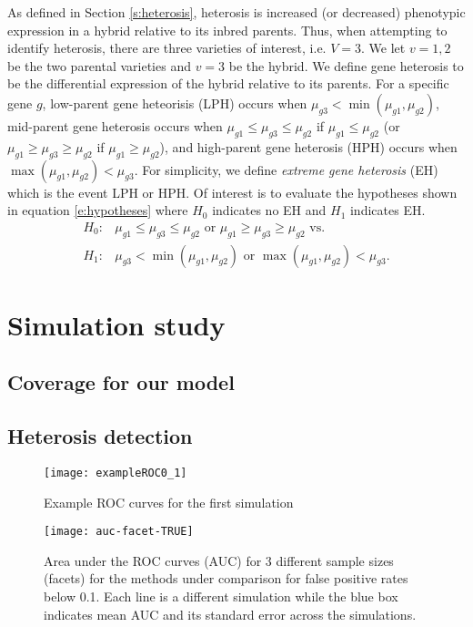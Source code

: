 \documentclass[useAMS,usenatbib,referee]{biom}
\begin{document}
As defined in Section \ref{s:heterosis}, heterosis is increased (or decreased) phenotypic expression in a hybrid relative to its inbred parents. Thus, when attempting to identify heterosis, there are three varieties of interest, i.e. $V=3$. We let $v=1,2$ be the two parental varieties and $v=3$ be the hybrid. We define gene heterosis to be the differential expression of the hybrid relative to its parents. For a specific gene $g$, low-parent gene heteorisis (LPH) occurs when $\mu_{g3}< \min(\mu_{g1},\mu_{g2})$, mid-parent gene heterosis occurs when $\mu_{g1}\le \mu_{g3}\le \mu_{g2}$ if $\mu_{g1}\le \mu_{g2}$ (or $\mu_{g1}\ge \mu_{g3}\ge \mu_{g2}$ if $\mu_{g1}\ge \mu_{g2}$), and high-parent gene heterosis (HPH) occurs when $\max(\mu_{g1},\mu_{g2}) < \mu_{g3}$. For simplicity, we define \emph{extreme gene heterosis} (EH) which is the event LPH or HPH. Of interest is to evaluate the hypotheses shown in equation \eqref{e:hypotheses} where $H_0$ indicates no EH and $H_1$ indicates EH. 
\begin{align}
\label{e:hypotheses}
H_0:&\mu_{g1}\le \mu_{g3}\le \mu_{g2} \mbox{ or } \mu_{g1}\ge \mu_{g3}\ge \mu_{g2} \mbox{\ \ vs.\ \ } \nonumber \\
H_1:&\mu_{g3}< \min(\mu_{g1},\mu_{g2}) \mbox{ or } \max(\mu_{g1},\mu_{g2}) < \mu_{g3}.
\end{align}


\section{Simulation study}
\label{s:simulation}

\subsection{Coverage for our model}



\subsection{Heterosis detection}

\begin{figure}[htbp]
\centerline{\texttt{[image: exampleROC0\_1]}}
\caption{Example ROC curves for the first simulation}
\label{f:roc}
\end{figure}

\begin{figure}
\centerline{\texttt{[image: auc-facet-TRUE]}}
\caption{Area under the ROC curves (AUC) for 3 different sample sizes (facets) for the methods under comparison for false positive rates below 0.1. Each line is a different simulation while the blue box indicates mean AUC and its standard error across the simulations.}
\end{figure}
\end{document}
